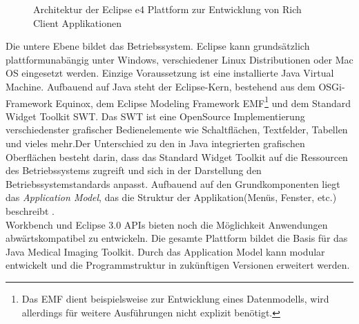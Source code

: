 \begin{figure}[htbp]
  \vspace{0.5cm}
  \centering
  \caption{Architektur der Eclipse e4 Plattform zur Entwicklung von Rich Client Applikationen}
  \label{eclipsee4arch}
  \vspace{0.5cm}
\end{figure}

Die untere Ebene bildet das Betriebssystem. Eclipse kann grundsätzlich plattformunabängig unter Windows, verschiedener Linux Distributionen oder Mac OS eingesetzt werden. Einzige Voraussetzung ist eine installierte Java Virtual Machine. Aufbauend auf Java steht der Eclipse-Kern, bestehend aus dem OSGi-Framework Equinox, dem Eclipse Modeling Framework EMF\footnote{Das EMF dient beispielsweise zur Entwicklung eines Datenmodells, wird allerdings für weitere Ausführungen nicht explizit benötigt.} und dem Standard Widget Toolkit SWT. Das SWT ist eine OpenSource Implementierung verschiedenster grafischer Bedienelemente wie Schaltflächen, Textfelder, Tabellen und vieles mehr.Der Unterschied zu den in Java integrierten grafischen Oberflächen besteht darin, dass das Standard Widget Toolkit auf die Ressourcen des Betriebssystems zugreift und sich in der Darstellung den Betriebssystemstandards anpasst\cite{eclipse:swt}. Aufbauend auf den Grundkomponenten liegt das \textit{Application Model}, das die Struktur der Applikation(Menüs, Fenster, etc.) beschreibt \cite[Kapitel 7]{vogel:e4overview}.\\
Workbench und Eclipse 3.0 APIs bieten noch die Möglichkeit Anwendungen abwärtskompatibel zu entwickeln. Die gesamte Plattform bildet die Basis für das Java Medical Imaging Toolkit. Durch das Application Model kann modular entwickelt und die Programmstruktur in zukünftigen Versionen erweitert werden.


